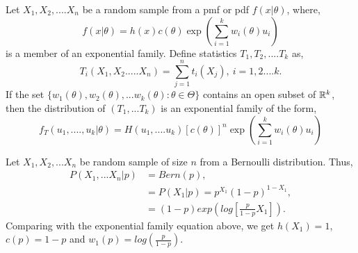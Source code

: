 \documentclass[a4paper,english,12pt]{article}
\begin{document}
\begin{thm}
Let $X_1,X_2,....X_n$ be a random sample from a pmf or pdf $f(x|\theta)$, where,
\begin{equation*}
f(x|\theta)=h(x)c(\theta)\exp\left(\sum_{i=1}^{k}w_i(\theta)u_i\right)
\end{equation*} 
is a member of an exponential family. Define statistics $T_1,T_2,....T_k$ as,
\begin{equation*}
T_i(X_1,X_2.....X_n)=\sum_{j=1}^{n}t_i(X_j),  ~i=1,2....k.
\end{equation*} 
If the set $\{w_1(\theta),w_2(\theta),...w_k(\theta):\theta\in\Theta\}$ contains an open subset of $\mathbb{R}^k$, then the distribution of $(T_1,...T_k)$ is an exponential family of the form,
\begin{equation*}
f_T(u_1,....,u_k|\theta)=H(u_1,....u_k)[c(\theta)]^n \exp\left(\sum_{i=1}^kw_i(\theta)u_i\right)
\end{equation*} 
\end{thm}
\begin{exmp}
Let $X_1,X_2,...X_n$ be random sample of size $n$ from a Bernoulli distribution. Thus, 
\begin{align}
P(X_1,...X_n|p)&=Bern(p),   \nonumber  \\
&=P(X_1|p)=p^{X_1}(1-p)^{1-X_1}, \nonumber \\
&=(1-p)exp\left(log\left[\frac{p}{1-p}X_1\right]\right).
\end{align}
Comparing with the exponential family equation above, we get $h(X_1)=1$,  $c(p)=1-p$ and $w_1(p)=log(\frac{p}{1-p})$.
\end{exmp}
\end{document}
